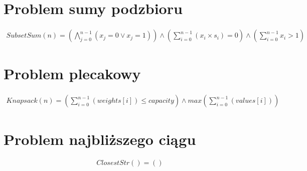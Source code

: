 \section{Problem sumy podzbioru}

\begin{align*}
	SubsetSum(n) = \left( \bigwedge_{j=0}^{n-1} (x_j = 0 \lor x_j = 1) \right) \land 
	\left( \sum_{i=0}^{n-1} (x_i \times s_i) = 0 \right) \land 
	\left( \sum_{i=0}^{n-1} x_i > 1 \right)
\end{align*}

\section{Problem plecakowy}

\begin{align*}
	Knapsack(n) = \left( \sum_{i=0}^{n-1} (weights[i]) \leq capacity \right) \land 
	max \left( \sum_{i=0}^{n-1} (values[i]) \right)
\end{align*}

\section{Problem najbliższego ciągu}

\begin{align*}
	ClosestStr() = \left(  \right) 
\end{align*}
